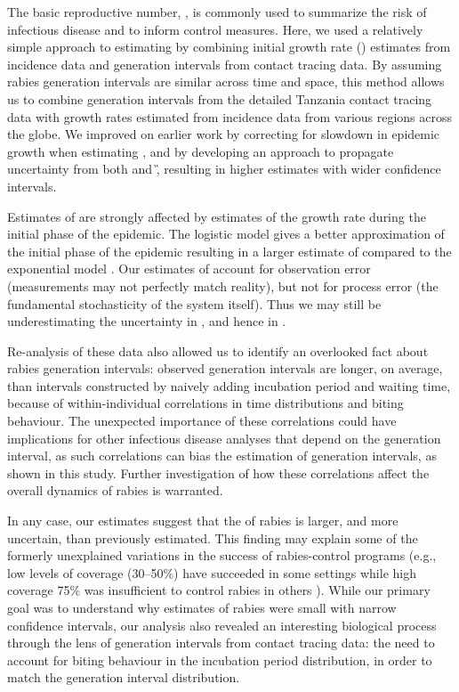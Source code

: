 The basic reproductive number, \rzero, is commonly used to summarize the risk of infectious disease and to inform control measures. Here, we used a relatively simple approach to estimating \rzero by combining initial growth rate (\littler) estimates from incidence data and generation intervals from contact tracing data.
By assuming rabies generation intervals are similar across time and space, this method allows us to combine generation intervals from the detailed Tanzania contact tracing data with growth rates estimated from incidence data from various regions across the globe. 
We improved on earlier work by correcting for slowdown in epidemic growth when estimating \littler, and by developing an approach to propagate uncertainty from both \littler and \G, resulting in higher \rzero estimates with wider confidence intervals.

Estimates of \rzero are strongly affected by estimates of the growth rate during the initial phase of the epidemic.
The logistic model gives a better approximation of the initial phase of the epidemic resulting in a larger estimate of \littler compared to the exponential model \citep{ma2014estimating}.
Our estimates of \littler account for observation error (measurements may not perfectly match reality), but not for process error (the fundamental stochasticity of the system itself). Thus we may still be underestimating the uncertainty in \littler, and hence in \rzero \citep{king2015avoidable}.

Re-analysis of these data also allowed us to identify an overlooked fact about rabies generation intervals: observed generation intervals are longer, on average, than intervals constructed by naively adding incubation period and waiting time, because of within-individual correlations in time distributions and biting behaviour. The unexpected importance of these correlations could have implications for other infectious disease analyses that depend on the generation interval, as such correlations can bias the estimation of generation intervals, as shown in this study. Further investigation of how these correlations affect the overall dynamics of rabies is warranted.

In any case, our estimates suggest that the \rzero of rabies is larger, and more uncertain, than previously estimated.
This finding may explain some of the formerly unexplained variations in the success of rabies-control programs (e.g., low levels of coverage (30–50\%) have succeeded in some settings while high coverage 75\% was insufficient to control rabies in others \citep{eng1993urban}).
While our primary goal was to understand why estimates of rabies \rzero were small with narrow confidence intervals, our analysis also revealed an interesting biological process through the lens of generation intervals from contact tracing data: the need to account for biting behaviour in the incubation period distribution, in order to match the generation interval distribution.
 
